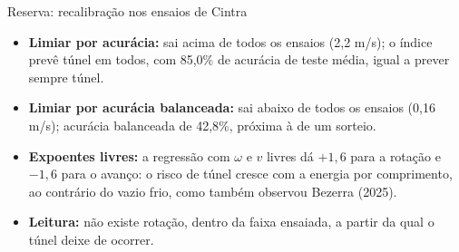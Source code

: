 \documentclass[aspectratio=169,11pt]{beamer}
\newenvironment{bullets}{\begin{itemize}\setlength{\itemsep}{5pt}}{\end{itemize}}
\begin{document}
\begin{frame}{Reserva: recalibração nos ensaios de Cintra}
\vspace{0.2cm}
\begin{bullets}
  \item \textbf{Limiar por acurácia:} sai acima de todos os ensaios (2,2 m/s); o índice prevê túnel em todos, com 85,0\% de acurácia de teste média, igual a prever sempre túnel.
  \item \textbf{Limiar por acurácia balanceada:} sai abaixo de todos os ensaios (0,16 m/s); acurácia balanceada de 42,8\%, próxima à de um sorteio.
  \item \textbf{Expoentes livres:} a regressão com $\omega$ e $v$ livres dá $+1{,}6$ para a rotação e $-1{,}6$ para o avanço: o risco de túnel cresce com a energia por comprimento, ao contrário do vazio frio, como também observou Bezerra (2025).
  \item \textbf{Leitura:} não existe rotação, dentro da faixa ensaiada, a partir da qual o túnel deixe de ocorrer.
\end{bullets}
\end{frame}
\end{document}
